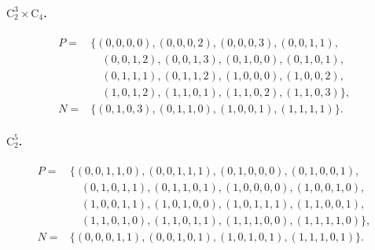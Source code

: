 \documentclass[11pt]{article}
\theoremstyle{remark}
\newcommand{\C}{\mathrm{C}}
\begin{document}
\paragraph{$\C_2^3\times\C_4$.}
\begin{align*}
P={}&\{(0,0,0,0),(0,0,0,2),(0,0,0,3),(0,0,1,1),\\
&\quad (0,0,1,2),(0,0,1,3),(0,1,0,0),(0,1,0,1),\\
&\quad (0,1,1,1),(0,1,1,2),(1,0,0,0),(1,0,0,2),\\
&\quad (1,0,1,2),(1,1,0,1),(1,1,0,2),(1,1,0,3)\},\\
N={}&\{(0,1,0,3),(0,1,1,0),(1,0,0,1),(1,1,1,1)\}.
\end{align*}

\paragraph{$\C_2^5$.}
\begin{align*}
P={}&\{(0,0,1,1,0),(0,0,1,1,1),(0,1,0,0,0),(0,1,0,0,1),\\
&\quad (0,1,0,1,1),(0,1,1,0,1),(1,0,0,0,0),(1,0,0,1,0),\\
&\quad (1,0,0,1,1),(1,0,1,0,0),(1,0,1,1,1),(1,1,0,0,1),\\
&\quad (1,1,0,1,0),(1,1,0,1,1),(1,1,1,0,0),(1,1,1,1,0)\},\\
N={}&\{(0,0,0,1,1),(0,0,1,0,1),(1,0,1,0,1),(1,1,1,0,1)\}.
\end{align*}
\end{document}
